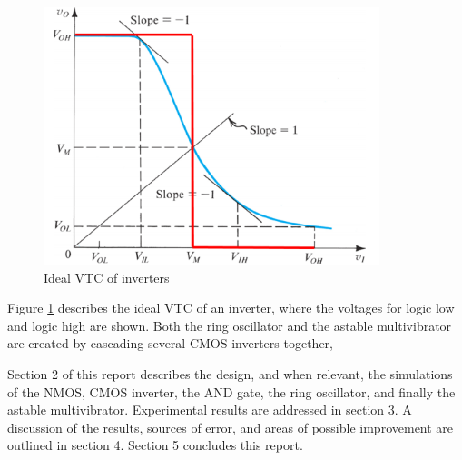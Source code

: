 \begin{figure}[H]
    \centering
    \includegraphics[width=.6\textwidth ]{Introduction/VTC_IDEAL.png}
    \caption{Ideal VTC of inverters \cite{b1}}
    \label{fig:vtcideal}
\end{figure}



\noindent     Figure \ref{fig:vtcideal} describes the ideal VTC of an inverter, where the voltages for logic low and logic high are shown. Both the ring oscillator and the astable multivibrator are created by cascading several CMOS inverters together,

\noindent Section 2 of this report describes the design, and when relevant, the simulations of the NMOS, CMOS inverter, the AND gate, the ring oscillator, and finally the astable multivibrator. Experimental results are addressed in section 3. A discussion of the results, sources of error, and areas of possible improvement are outlined in section 4. Section 5 concludes this report. \newline




